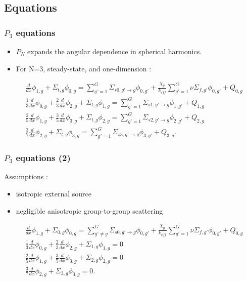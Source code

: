 
\subsection{Equations}
\begin{frame}
\frametitle{$P_3$ equations}

\begin{itemize}
  \item $P_N$ expands the angular dependence in spherical harmonics.
  \item For N=3, steady-state, and one-dimension \cite{davidson_neutron_1957}:
\end{itemize}

\begin{align}
    & \frac{d}{dx} \phi_{1,g} + \Sigma_{t,g} \phi_{0,g} = \sum_{g'=1}^G \Sigma_{s0,g' \rightarrow g} \phi_{0,g'} + \frac{\chi_g}{k_{eff}} \sum_{g'=1}^G \nu\Sigma_{f,g'} \phi_{0,g'} + Q_{0,g}  \label{eq:SP3-0} \\
    & \frac{1}{3} \frac{d}{dx} \phi_{0,g} + \frac{2}{3}\frac{d}{dx}\phi_{2,g} + \Sigma_{t,g} \phi_{1,g} = \sum_{g'=1}^G \Sigma_{s1,g' \rightarrow g} \phi_{1,g'} + Q_{1,g} \label{eq:SP3-1} \\
    & \frac{2}{5} \frac{d}{dx}\phi_{1,g} + \frac{3}{5}\frac{d}{dx}\phi_{3,g} + \Sigma_{t,g} \phi_{2,g} = \sum_{g'=1}^G \Sigma_{s2,g' \rightarrow g} \phi_{2,g'} + Q_{2,g} \label{eq:SP3-2} \\
    & \frac{3}{7}\frac{d}{dx}\phi_{2,g} + \Sigma_{t,g} \phi_{3,g} = \sum_{g'=1}^G \Sigma_{s3,g' \rightarrow g} \phi_{3,g'} + Q_{3,g}. \label{eq:P3-3}
\end{align}
\end{frame}


\begin{frame}
\frametitle{$P_3$ equations (2)}

Assumptions \cite{brantley_simplifiedP3_2000}:
\begin{itemize}
	\item isotropic external source
	\item negligible anisotropic group-to-group scattering
\end{itemize}

\begin{align}
    & \frac{d}{dx} \phi_{1,g} + \Sigma_{0,g} \phi_{0,g} = \sum_{g'\ne g}^G \Sigma_{s0,g' \rightarrow g} \phi_{0,g'} + \frac{\chi_g}{k_{eff}} \sum_{g'=1}^G \nu\Sigma_{f,g'} \phi_{0,g'} + Q_{0,g}  \label{eq:SP3-0b} \\
    & \frac{1}{3} \frac{d}{dx} \phi_{0,g} + \frac{2}{3}\frac{d}{dx}\phi_{2,g} + \Sigma_{1,g} \phi_{1,g} = 0  \label{eq:SP3-1b} \\
    & \frac{2}{5} \frac{d}{dx}\phi_{1,g} + \frac{3}{5}\frac{d}{dx}\phi_{3,g} + \Sigma_{2,g} \phi_{2,g} = 0  \label{eq:SP3-2b} \\
    & \frac{3}{7}\frac{d}{dx}\phi_{2,g} + \Sigma_{3,g} \phi_{3,g} = 0. \label{eq:SP3-3b}
\end{align}
\end{frame}



